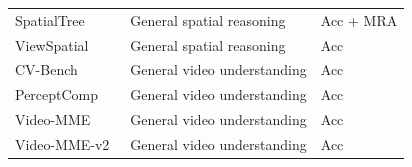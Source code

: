\begin{table}[h]
{\begin{tabular}{lll}
SpatialTree~\citep{xiao2025spatialtree} & General spatial reasoning & Acc + MRA \\
ViewSpatial~\citep{li2025viewspatial}   & General spatial reasoning & Acc \\
\midrule
CV-Bench~\citep{zhu2025cvbench}         & General video understanding & Acc \\
PerceptComp~\citep{li2026perceptioncomp}& General video understanding & Acc \\
Video-MME~\citep{fu2025video}           & General video understanding & Acc \\
Video-MME-v2~\citep{videommev2_2026}    & General video understanding & Acc \\
\bottomrule
\end{tabular}}
\end{table}
